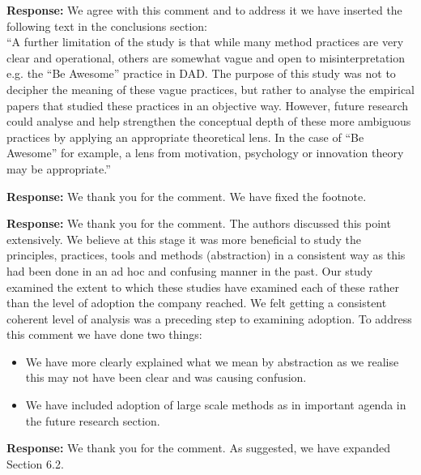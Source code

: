 \documentclass[a4paper,twoside,11pt]{reviewresponse}
\begin{document}
\textbf{Response:} We agree with this comment and to address it we have inserted the following text in the conclusions section: \\
``A further limitation of the study is that while many method practices are very clear and operational, others are somewhat vague and open to misinterpretation e.g. the ``Be Awesome'' practice in DAD. The purpose of this study was not to decipher the meaning of these vague practices, but rather to analyse the empirical papers that studied these practices in an objective way. However, future research could analyse and help strengthen the conceptual depth of these more ambiguous practices by applying an appropriate theoretical lens. In the case of ``Be Awesome'' for example, a lens from motivation, psychology or innovation theory may be appropriate.''

\textbf{Response:}
We thank you for the comment. We have fixed the footnote.

\textbf{Response:}
We thank you for the comment. The authors discussed this point extensively. We believe at this stage it was more beneficial to study the principles, practices, tools and methods (abstraction) in a consistent way as this had been done in an ad hoc and confusing manner in the past. Our study examined the extent to which these studies have examined each of these rather than the level of adoption the company reached. We felt getting a consistent coherent level of analysis was a preceding step to examining adoption. To address this comment we have done two things:
\begin{itemize}
	\item	We have more clearly explained what we mean by abstraction as we realise this may not have been clear and was causing confusion.
	\item	We have included adoption of large scale methods as in important agenda in the future research section.
\end{itemize}

\textbf{Response:}
We thank you for the comment. As suggested, we have expanded Section 6.2.
\end{document}
